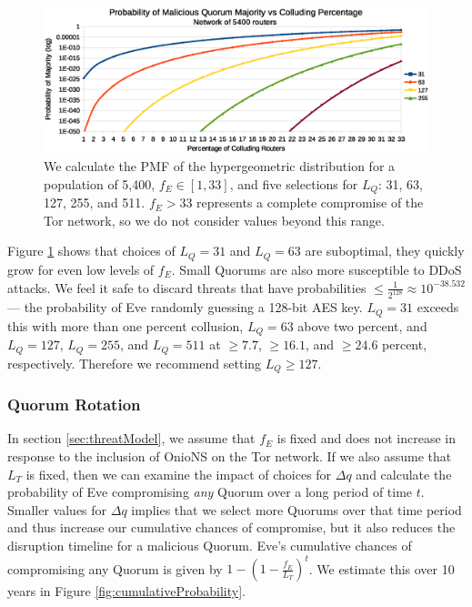 \documentclass{sig-alternate}
\begin{document}
\begin{figure}[h]
	\centering
	\includegraphics[width=\linewidth]{../analysis/MaliciousQuorumProbability_tight.eps}
	\caption{We calculate the PMF of the hypergeometric distribution for a population of 5,400, $ f_{E} \in [1,33] $, and five selections for $ L_{Q} $: 31, 63, 127, 255, and 511. $ f_{E} > 33 $ represents a complete compromise of the Tor network, so we do not consider values beyond this range.}
	\label{fig:quorumMajority}
\end{figure}

Figure \ref{fig:quorumMajority} shows that choices of $ L_{Q} = 31 $ and $ L_{Q} = 63 $ are suboptimal, they quickly grow for even low levels of $ f_{E} $. Small Quorums are also more susceptible to DDoS attacks. We feel it safe to discard threats that have probabilities $ \leq \frac{1}{2^{128}} \approx 10^{-38.532} $ --- the probability of Eve randomly guessing a 128-bit AES key. $ L_{Q} = 31 $ exceeds this with more than one percent collusion, $ L_{Q} = 63 $ above two percent, and $ L_{Q} = 127 $, $ L_{Q} = 255 $, and $ L_{Q} = 511 $ at $ \geq 7.7 $, $ \geq 16.1 $, and $ \geq 24.6 $ percent, respectively. Therefore we recommend setting $ L_{Q} \geq 127 $.

\subsubsection{Quorum Rotation}

In section \ref{sec:threatModel}, we assume that $ f_{E} $ is fixed and does not increase in response to the inclusion of OnioNS on the Tor network. If we also assume that $ L_{T} $ is fixed, then we can examine the impact of choices for $ \Delta q $ and calculate the probability of Eve compromising \emph{any} Quorum over a long period of time $ t $. Smaller values for $ \Delta q $ implies that we select more Quorums over that time period and thus increase our cumulative chances of compromise, but it also reduces the disruption timeline for a malicious Quorum. Eve's cumulative chances of compromising any Quorum is given by $ 1 - (1 - \frac{f_{E}}{L_{T}})^t $. We estimate this over 10 years in Figure \ref{fig:cumulativeProbability}. 
\end{document}
